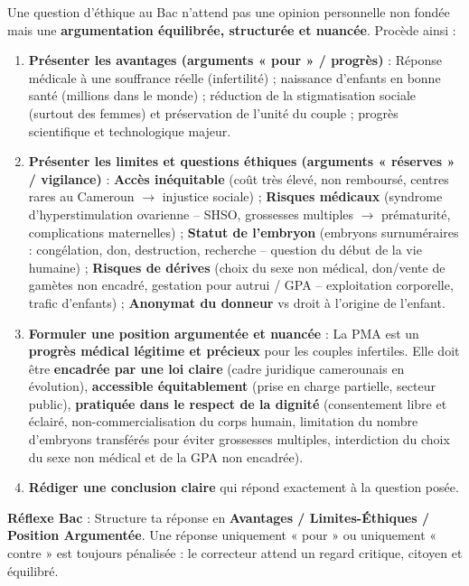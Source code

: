 \documentclass[11pt]{article}
\begin{document}
\begin{methode}
Une question d'éthique au Bac n'attend pas une opinion personnelle non fondée mais une \textbf{argumentation équilibrée, structurée et nuancée}. Procède ainsi :
\begin{enumerate}
\item \textbf{Présenter les avantages (arguments « pour » / progrès)} : Réponse médicale à une souffrance réelle (infertilité) ; naissance d'enfants en bonne santé (millions dans le monde) ; réduction de la stigmatisation sociale (surtout des femmes) et préservation de l'unité du couple ; progrès scientifique et technologique majeur.
\item \textbf{Présenter les limites et questions éthiques (arguments « réserves » / vigilance)} : \textbf{Accès inéquitable} (coût très élevé, non remboursé, centres rares au Cameroun $\rightarrow$ injustice sociale) ; \textbf{Risques médicaux} (syndrome d'hyperstimulation ovarienne -- SHSO, grossesses multiples $\rightarrow$ prématurité, complications maternelles) ; \textbf{Statut de l'embryon} (embryons surnuméraires : congélation, don, destruction, recherche -- question du début de la vie humaine) ; \textbf{Risques de dérives} (choix du sexe non médical, don/vente de gamètes non encadré, gestation pour autrui / GPA -- exploitation corporelle, trafic d'enfants) ; \textbf{Anonymat du donneur} vs droit à l'origine de l'enfant.
\item \textbf{Formuler une position argumentée et nuancée} : La PMA est un \textbf{progrès médical légitime et précieux} pour les couples infertiles. Elle doit être \textbf{encadrée par une loi claire} (cadre juridique camerounais en évolution), \textbf{accessible équitablement} (prise en charge partielle, secteur public), \textbf{pratiquée dans le respect de la dignité} (consentement libre et éclairé, non-commercialisation du corps humain, limitation du nombre d'embryons transférés pour éviter grossesses multiples, interdiction du choix du sexe non médical et de la GPA non encadrée).
\item \textbf{Rédiger une conclusion claire} qui répond exactement à la question posée.
\end{enumerate}
\textbf{Réflexe Bac} : Structure ta réponse en \textbf{Avantages / Limites-Éthiques / Position Argumentée}. Une réponse uniquement « pour » ou uniquement « contre » est toujours pénalisée : le correcteur attend un regard critique, citoyen et équilibré.
\end{methode}
\end{document}
